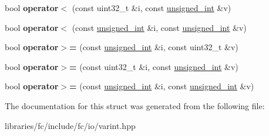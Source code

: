 \begin{DoxyCompactItemize}
\item 
\mbox{\label{structfc_1_1unsigned__int_a9672c0a7766d6491003103052ddc692b}} 
bool {\bfseries operator$<$} (const uint32\+\_\+t \&i, const \mbox{\hyperlink{structfc_1_1unsigned__int}{unsigned\+\_\+int}} \&v)
\item 
\mbox{\label{structfc_1_1unsigned__int_a5c44ed2d978a1bdaf65166f98592192c}} 
bool {\bfseries operator$<$} (const \mbox{\hyperlink{structfc_1_1unsigned__int}{unsigned\+\_\+int}} \&i, const \mbox{\hyperlink{structfc_1_1unsigned__int}{unsigned\+\_\+int}} \&v)
\item 
\mbox{\label{structfc_1_1unsigned__int_abf1274ffb924723bc12f17544159c799}} 
bool {\bfseries operator$>$=} (const \mbox{\hyperlink{structfc_1_1unsigned__int}{unsigned\+\_\+int}} \&i, const uint32\+\_\+t \&v)
\item 
\mbox{\label{structfc_1_1unsigned__int_ad6f6d75188bb59e24af40ff8aa4de947}} 
bool {\bfseries operator$>$=} (const uint32\+\_\+t \&i, const \mbox{\hyperlink{structfc_1_1unsigned__int}{unsigned\+\_\+int}} \&v)
\item 
\mbox{\label{structfc_1_1unsigned__int_aedda267438195592daa499b41727101a}} 
bool {\bfseries operator$>$=} (const \mbox{\hyperlink{structfc_1_1unsigned__int}{unsigned\+\_\+int}} \&i, const \mbox{\hyperlink{structfc_1_1unsigned__int}{unsigned\+\_\+int}} \&v)
\end{DoxyCompactItemize}


The documentation for this struct was generated from the following file\+:\begin{DoxyCompactItemize}
\item 
libraries/fc/include/fc/io/varint.\+hpp\end{DoxyCompactItemize}
